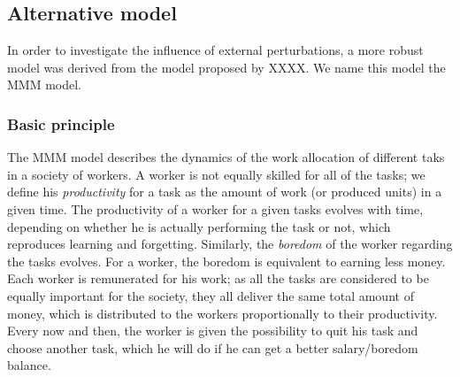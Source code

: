\subsection{Alternative model}

In order to investigate the influence of external perturbations, a more robust model was derived from the model proposed by XXXX. We name this model the MMM model.

\subsubsection{Basic principle}
The MMM model describes the dynamics of the work allocation of different taks in a society of workers. 
A worker is not equally skilled for all of the tasks; we define his \emph{productivity} for a task as the amount of work (or produced units) in a given time. 
The productivity of a worker for a given tasks evolves with time, depending on whether he is actually performing the task or not, which reproduces learning and forgetting. Similarly, the \emph{boredom} of the worker regarding the tasks evolves. For a worker, the boredom is equivalent to earning less money.
Each worker is remunerated for his work; as all the tasks are considered to be equally important for the society, they all deliver the same total amount of money, which is distributed to the workers proportionally to their productivity.
Every now and then, the worker is given the possibility to quit his task and choose another task, which he will do if he can get a better salary/boredom balance. 


